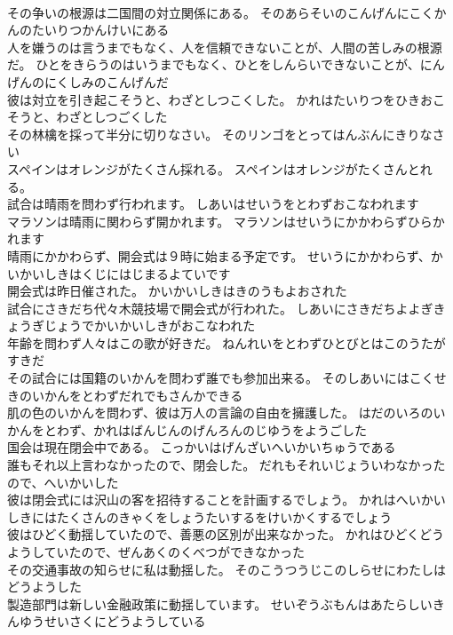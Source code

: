 \documentclass[8pt]{extreport}
\begin{document}
\begin{CJK}{UTF8}{min}
\\	その争いの根源は二国間の対立関係にある。	そのあらそいのこんげんにこくかんのたいりつかんけいにある 
\\	人を嫌うのは言うまでもなく、人を信頼できないことが、人間の苦しみの根源だ。	ひとをきらうのはいうまでもなく、ひとをしんらいできないことが、にんげんのにくしみのこんげんだ 
\\	彼は対立を引き起こそうと、わざとしつこくした。	かれはたいりつをひきおこそうと、わざとしつごくした 
\\	その林檎を採って半分に切りなさい。	そのリンゴをとってはんぶんにきりなさい 
\\	スペインはオレンジがたくさん採れる。	スペインはオレンジがたくさんとれる。 
\\	試合は晴雨を問わず行われます。	しあいはせいうをとわずおこなわれます 
\\	マラソンは晴雨に関わらず開かれます。	マラソンはせいうにかかわらずひらかれます 
\\	晴雨にかかわらず、開会式は９時に始まる予定です。	せいうにかかわらず、かいかいしきはくじにはじまるよていです 
\\	開会式は昨日催された。	かいかいしきはきのうもよおされた 
\\	試合にさきだち代々木競技場で開会式が行われた。	しあいにさきだちよよぎきょうぎじょうでかいかいしきがおこなわれた 
\\	年齢を問わず人々はこの歌が好きだ。	ねんれいをとわずひとびとはこのうたがすきだ 
\\	その試合には国籍のいかんを問わず誰でも参加出来る。	そのしあいにはこくせきのいかんをとわずだれでもさんかできる 
\\	肌の色のいかんを問わず、彼は万人の言論の自由を擁護した。	はだのいろのいかんをとわず、かれはばんじんのげんろんのじゆうをようごした 
\\	国会は現在閉会中である。	こっかいはげんざいへいかいちゅうである 
\\	誰もそれ以上言わなかったので、閉会した。	だれもそれいじょういわなかったので、へいかいした 
\\	彼は閉会式には沢山の客を招待することを計画するでしょう。	かれはへいかいしきにはたくさんのきゃくをしょうたいするをけいかくするでしょう 
\\	彼はひどく動揺していたので、善悪の区別が出来なかった。	かれはひどくどうようしていたので、ぜんあくのくべつができなかった 
\\	その交通事故の知らせに私は動揺した。	そのこうつうじこのしらせにわたしはどうようした 
\\	製造部門は新しい金融政策に動揺しています。	せいぞうぶもんはあたらしいきんゆうせいさくにどうようしている 

\end{CJK}
\end{document}
